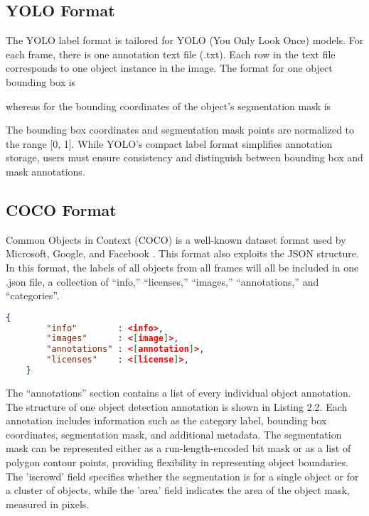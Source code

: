 \subsection{YOLO Format} 

The YOLO label format is tailored for YOLO (You Only Look Once) models. For each frame, there is one annotation text file (.txt). Each row in the text file corresponds to one object instance in the image. The format for one object bounding box is
\begin{center}
\end{center}
whereas for the bounding coordinates of the object's segmentation mask is
\begin{center}
\end{center}
The bounding box coordinates and segmentation mask points are normalized to the range [0, 1]. While YOLO's compact label format simplifies annotation storage, users must ensure consistency and distinguish between bounding box and mask annotations.

\subsection{COCO Format} \label{sec:cocoformat}

Common Objects in Context (COCO) is a well-known dataset format used by Microsoft, Google, and Facebook  \cite{cocoformat}. This format also exploits the JSON structure. In this format, the labels of all objects from all frames will all be included in one .json file, a collection of “info,” “licenses,” “images,” “annotations,” and “categories”. 

\begin{lstlisting}[language=json, keepspaces=true]
	{
		"info"        : <info>, 
		"images"      : <[image]>, 
		"annotations" : <[annotation]>, 
		"licenses"    : <[license]>,
	}
\end{lstlisting}

The “annotations” section contains a list of every individual object annotation. The structure of one object detection annotation is shown in Listing 2.2. Each annotation includes information such as the category label, bounding box coordinates, segmentation mask, and additional metadata. The segmentation mask can be represented either as a run-length-encoded bit mask or as a list of polygon contour points, providing flexibility in representing object boundaries. The 'iscrowd' field specifies whether the segmentation is for a single object or for a cluster of objects, while the 'area' field indicates the area of the object mask, measured in pixels.


